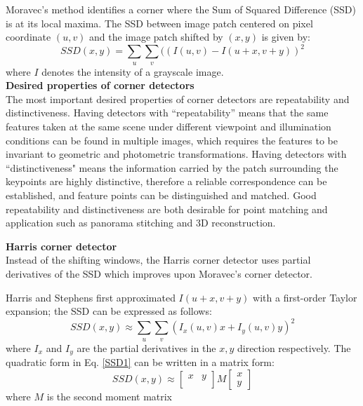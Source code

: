 \documentclass[twoside]{article}
\begin{document}
Moravec's method identifies a corner where the Sum of Squared Difference (SSD) is at its local maxima. The SSD between image patch centered on pixel coordinate $(u,v)$ and the image patch shifted by $(x,y)$ is given by:
\begin{equation}
SSD(x,y) = \sum_u \sum_v ((I(u,v)-I(u+x,v+y))^2
\end{equation}
where $I$ denotes the intensity of a grayscale image. \\

\textbf{Desired properties of corner detectors}\\
The most important desired properties of corner detectors are repeatability and distinctiveness. Having detectors with ``repeatability'' means that the same features taken at the same scene under different viewpoint and illumination conditions can be found in multiple images, which requires the features to be invariant to geometric and photometric transformations. Having detectors with ``distinctiveness" means the information carried by the patch surrounding the keypoints are highly distinctive, therefore a reliable correspondence can be established, and feature points can be distinguished and matched. Good repeatability and distinctiveness are both desirable for point matching and application such as panorama stitching and 3D reconstruction.  

\textbf{Harris corner detector}\\
Instead of the shifting windows, the Harris corner detector \cite{Harris} uses partial derivatives of the SSD which improves upon Moravec's corner detector. 

Harris and Stephens first approximated $I(u+x,v+y)$ with a first-order Taylor expansion; the SSD can be expressed as follows:
\begin{equation}
SSD(x,y) \approx \sum_u \sum_v (I_x(u,v)x+I_y(u,v)y)^2
\label{SSD1}
\end{equation}
where $I_x$ and $I_y$ are the partial derivatives in the $x, y$ direction respectively. The quadratic form in Eq. \ref{SSD1} can be written in a matrix form:
\begin{equation}
SSD(x,y) \approx
\begin{bmatrix}
x & y\\
\end{bmatrix}
M
\begin{bmatrix}
x \\y
\end{bmatrix}
\end{equation}
where $M$ is the second moment matrix
\end{document}

